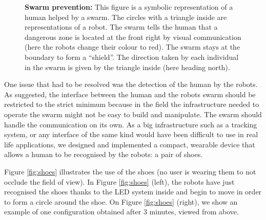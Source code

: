 \documentclass[oneside, a4paper, 12pt]{memoir}
\newcommand{\epuck}[3][0] %
{
	\draw [very thick, fill=white] (#2,#3) circle [radius=0.5];
	\draw [very thick, rotate around={#1:(#2,#3)}] (#2-0.25,#3-0.433) -- (#2,#3+0.45) -- (#2+0.25,#3-0.433);
}
\newcommand{\epuckred}[3][0] %
{
	\draw [very thick, fill=orange] (#2,#3) circle [radius=0.5];
	\draw [very thick, rotate around={#1:(#2,#3)}] (#2-0.25,#3-0.433) -- (#2,#3+0.45) -- (#2+0.25,#3-0.433);
}
\newcommand{\human}[3][0] %
{
	\draw [very thick, fill=white, rotate around={#1:(#2,#3)}] (#2-1,#3+0.5) ellipse (0.25cm and 0.5cm);
	\draw [very thick, fill=white, rotate around={#1:(#2,#3)}] (#2+1,#3+0.5) ellipse (0.25cm and 0.5cm);
	\draw [very thick, fill=white, rotate around={#1:(#2,#3)}] (#2,#3) ellipse (1.5cm and 0.75cm);
	\draw [thick, fill=white, rotate around={#1:(#2,#3)}] (#2-0.05,#3+1) -- (#2,#3+1.1) -- (#2+0.05,#3+1);
	\draw [very thick, fill=white, rotate around={#1:(#2,#3)}] (#2,#3+0.5) circle [radius=0.5cm];
}
\let\oldCaption\caption
\renewcommand{\caption}[2]{
\oldCaption[#1]{{\small\sffamily\bfseries #1:} #2}
}
\begin{document}
	\begin{figure}[!htp]\centering
		
		\caption{Swarm prevention}{This figure is a symbolic representation of a human helped by a swarm. The circles with a triangle inside are representations of a robot. The swarm tells the human that a dangerous zone is located at the front right by visual communication (here the robots change their colour to red). The swarm stays at the boundary to form a \enquote{shield}. The direction taken by each individual in the swarm is given by the triangle inside (here heading north).}
		\label{fig:swarm_preventing}
	\end{figure}
	
	One issue that had to be resolved was the detection of the human by the robots. As \citet{podevijn2012self} suggested, the interface between the human and the robots swarm should be restricted to the strict minimum because in the field the infrastructure needed to operate the swarm might not be easy to build and manipulate. The swarm should handle the communication on its own. As a big infrastructure such as a tracking system, or any interface of the same kind would have been difficult to use in real life applications, we designed and implemented a compact, wearable device that allows a human to be recognised by the robots: a pair of shoes.
	
	Figure \ref{fig:shoes} illustrates the use of the shoes (no user is wearing them to not occlude the field of view). In Figure \ref{fig:shoes} (left), the robots have just recognised the shoes thanks to the LED system inside and begin to move in order to form a circle around the shoe. On Figure \ref{fig:shoes} (right), we show an example of one configuration obtained after 3 minutes, viewed from above.
	
\end{document}
